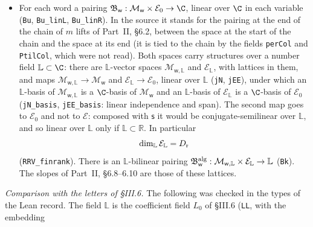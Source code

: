 \documentclass[11pt,letterpaper]{article}
\begin{document}
\begin{itemize}
\emph{conjugate-linear} map $\mathsf s:\mathcal E_0\to\mathcal H$ which preserves norms (\texttt{sEE}). So
$\mathsf s(cF)=\bar c\,\mathsf s(F)$ for $c\in\C$, and $\mathsf s$ is injective. Its image
$\mathcal E=\mathsf s(\mathcal E_0)$ is a complex subspace of $\mathcal H$ of dimension $D_{\rm r}$. There is a
number $\delta_{\rm p}\le1$ with $D_{\rm r}=(1-\delta_{\rm p})D$ (\texttt{Drows}, \texttt{delp}, \texttt{D\_eq}).
The spaces $\mathcal E_0$ and $\mathcal E$ have the same elements up to $\mathsf s$, with conjugate actions of
the scalars. They are kept apart below.
\item For each word a pairing $\mathfrak B_{\mathsf w}:\mathcal M_{\mathsf w}\times\mathcal E_0\to\C$, linear over
$\C$ in each variable (\texttt{Bu}, \texttt{Bu\_linL}, \texttt{Bu\_linR}). In the source it stands for the
pairing at the end of the chain of $m$ lifts of Part~II, \S6.2, between the space at the start of the chain
and the space at its end (it is tied to the chain by the fields \texttt{perCol} and \texttt{PtilCol}, which
were not read). Both spaces carry structures over a number field $\mathbb L\subset\C$: there are
$\mathbb L$-vector spaces $\mathcal M_{\mathsf w,\mathbb L}$ and $\mathcal E_{\mathbb L}$, with lattices in them,
and maps $\mathcal M_{\mathsf w,\mathbb L}\to\mathcal M_{\mathsf w}$ and $\mathcal E_{\mathbb L}\to\mathcal E_0$,
linear over $\mathbb L$ (\texttt{jN}, \texttt{jEE}), under which an $\mathbb L$-basis of
$\mathcal M_{\mathsf w,\mathbb L}$ is a $\C$-basis of $\mathcal M_{\mathsf w}$ and an $\mathbb L$-basis of
$\mathcal E_{\mathbb L}$ is a $\C$-basis of $\mathcal E_0$ (\texttt{jN\_basis}, \texttt{jEE\_basis}: linear
independence and span). The second map goes to $\mathcal E_0$ and not to $\mathcal E$: composed with
$\mathsf s$ it would be conjugate-semilinear over $\mathbb L$, and so linear over $\mathbb L$ only if
$\mathbb L\subset\mathbb R$. In particular
\begin{equation}\label{tr:dimE}
 \dim_{\mathbb L}\mathcal E_{\mathbb L}=D_{\rm r}
\end{equation}
(\texttt{RRV\_finrank}). There is an $\mathbb L$-bilinear pairing
$\mathfrak B^{\rm alg}_{\mathsf w}:\mathcal M_{\mathsf w,\mathbb L}\times\mathcal E_{\mathbb L}\to\mathbb L$
(\texttt{Bk}). The slopes of Part~II, \S6.8--6.10 are those of these lattices.
\end{itemize}
\emph{Comparison with the letters of \S III.6.} The following was checked in the types of the Lean record.
The field $\mathbb L$ is the coefficient field $L_0$ of \S III.6 (\texttt{LL}, with the embedding
\end{document}
